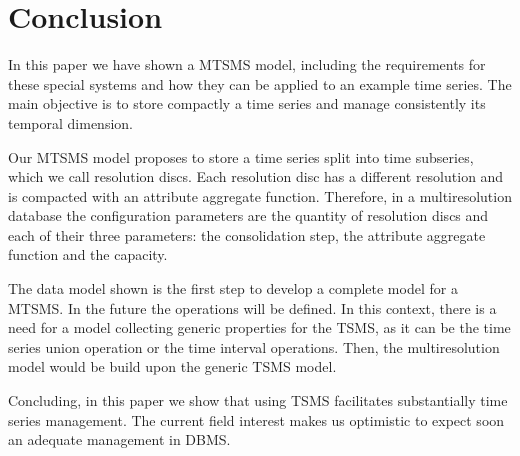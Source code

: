 \section{Conclusion} 
\label{sec:concl-future-work}

In this paper we have shown a MTSMS model, including the requirements
for these special systems and how they can be applied to an example
time series. The main objective is to store compactly a time series
and manage consistently its temporal dimension.

Our MTSMS model proposes to store a time series split into time
subseries, which we call resolution discs.  Each resolution disc has a
different resolution and is compacted with an attribute aggregate
function. Therefore, in a multiresolution database the configuration
parameters are the quantity of resolution discs and each of their
three parameters: the consolidation step, the attribute aggregate
function and the capacity.

The data model shown is the first step to develop a complete model for
a MTSMS. In the future the operations will be defined. In this
context, there is a need for a model collecting generic properties for
the TSMS, as it can be the time series union operation or the time
interval operations. Then, the multiresolution model would be build
upon the generic TSMS model.

Concluding, in this paper we show that using TSMS facilitates
substantially time series management. The current field interest makes
us optimistic to expect soon an adequate management in DBMS.


